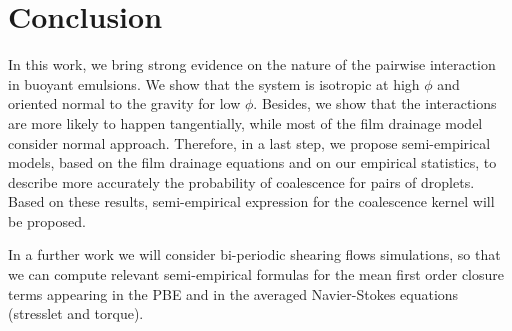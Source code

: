 \documentclass[twocolumn,a4paper,10pt]{scrartcl}
\begin{document}
\section*{Conclusion}

In this work, we bring strong evidence on the nature of the pairwise interaction in buoyant emulsions. 
We show that the system is isotropic at high $\phi$ and oriented normal to the gravity for low $\phi$.
Besides, we show that the interactions are more likely to happen tangentially,
while most of the film drainage model consider normal approach. 
Therefore, in a last step, we propose semi-empirical models, based on the film drainage equations and on our empirical statistics, to describe more accurately the probability of coalescence for pairs of droplets. 
Based on these results, semi-empirical expression for the coalescence kernel will be proposed. 

In a further work we will consider bi-periodic shearing flows simulations, so that we can compute relevant semi-empirical formulas for the mean first order closure terms appearing in the PBE and in the averaged Navier-Stokes equations (stresslet and torque).



\end{document}
